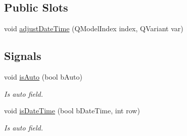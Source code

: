 \subsection*{Public Slots}
\begin{DoxyCompactItemize}
\item 
void \hyperlink{class_custom_time_ctrl_ab385f1fff588560878db14f4ed1516cb}{adjustDateTime} (QModelIndex index, QVariant var)
\end{DoxyCompactItemize}
\subsection*{Signals}
\begin{DoxyCompactItemize}
\item 
void \hyperlink{class_custom_time_ctrl_aadc7a3337d1964c143c5d9da7bbc8f25}{isAuto} (bool bAuto)
\begin{DoxyCompactList}\small\item\em Is auto field. \item\end{DoxyCompactList}\item 
void \hyperlink{class_custom_time_ctrl_a7d9d68dbb0ad314e8e9e403b71398ac6}{isDateTime} (bool bDateTime, int row)
\begin{DoxyCompactList}\small\item\em Is auto field. \item\end{DoxyCompactList}\end{DoxyCompactItemize}
